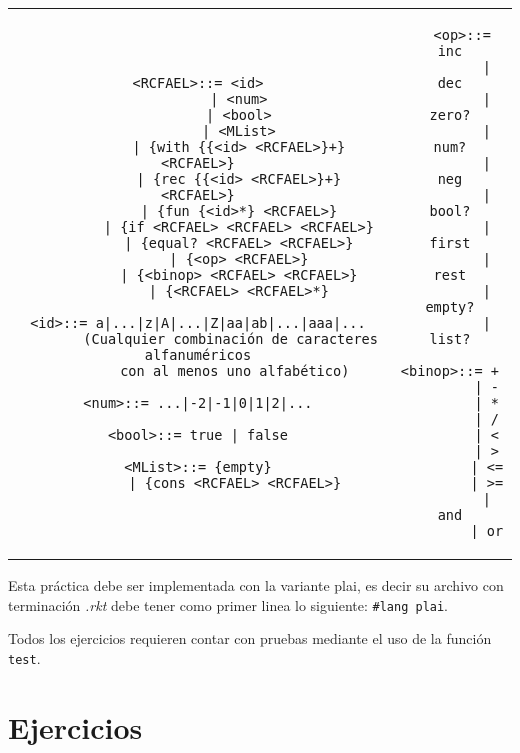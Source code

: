 \documentclass{article}
\begin{document}
\begin{tabular}{c c}
  \begin{minipage}[t]{10cm}
\begin{verbatim}
<RCFAEL>::= <id>
          | <num>
          | <bool>
          | <MList>
          | {with {{<id> <RCFAEL>}+} <RCFAEL>}
          | {rec {{<id> <RCFAEL>}+} <RCFAEL>}
          | {fun {<id>*} <RCFAEL>}
          | {if <RCFAEL> <RCFAEL> <RCFAEL>}
          | {equal? <RCFAEL> <RCFAEL>}
          | {<op> <RCFAEL>}
          | {<binop> <RCFAEL> <RCFAEL>}
          | {<RCFAEL> <RCFAEL>*}

<id>::= a|...|z|A|...|Z|aa|ab|...|aaa|...
        (Cualquier combinación de caracteres alfanuméricos
         con al menos uno alfabético)

<num>::= ...|-2|-1|0|1|2|...

<bool>::= true | false

<MList>::= {empty}
         | {cons <RCFAEL> <RCFAEL>}

\end{verbatim}
  \end{minipage}
  &
  \begin{minipage}[t]{6cm}
\begin{verbatim}
   <op>::= inc
         | dec
         | zero?
         | num?
         | neg
         | bool?
         | first
         | rest
         | empty?
         | list?

<binop>::= +
         | -
         | *
         | /
         | <
         | >
         | <=
         | >=
         | and
         | or

\end{verbatim}
  \end{minipage}
\end{tabular}

Esta práctica debe ser implementada con la variante plai, es decir
su archivo con terminación \textit{.rkt} debe tener como primer linea lo siguiente:
\texttt{\#lang plai}.

Todos los ejercicios requieren contar con pruebas mediante el uso de
la función \texttt{test}.

\section{Ejercicios}
\end{document}
